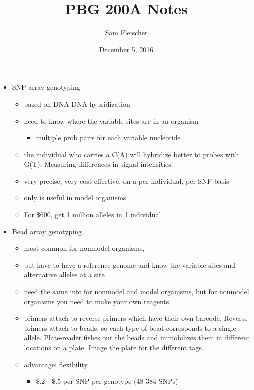\documentclass{article}
\title{PBG 200A Notes}
\author{Sam Fleischer}
\date{December 5, 2016}
\begin{document}
    \maketitle

    \begin{itemize}
        \item SNP array genotyping
        \begin{itemize}
            \item based on DNA-DNA hybridization
            \item need to know where the variable sites are in an organism
            \begin{itemize}
                \item multiple prob pairs for each variable nucleotide
            \end{itemize}
            \item the individual who carries a C(A) will hybridize better to probes with G(T).  Measuring differences in signal intensities.
            \item very precise, very cost-effective, on a per-individual, per-SNP basis
            \item only is useful in model organisms
            \item For \$600, get 1 million alleles in 1 individual.
        \end{itemize}
        \item Bead array genotyping
        \begin{itemize}
            \item most common for nonmodel organisms,
            \item but have to have a reference genome and know the variable sites and alternative alleles at a site
            \item need the same info for nonmodel and model organisms, but for nonmodel organisms you need to make your own reagents.
            \item primers attach to reverse-primers which have their own barcode.  Reverse primers attach to beads, so each type of bead corresponds to a single allele.  Plate-reader fishes out the beads and immobilizes them in different locations on a plate.  Image the plate for the different tags.
            \item advantage: flexibility.
            \begin{itemize}
                \item $\$.2$ - $\$.5$ per SNP per genotype (48-384 SNPs)

\end{itemize}
\end{itemize}
\end{itemize}
\end{document}

